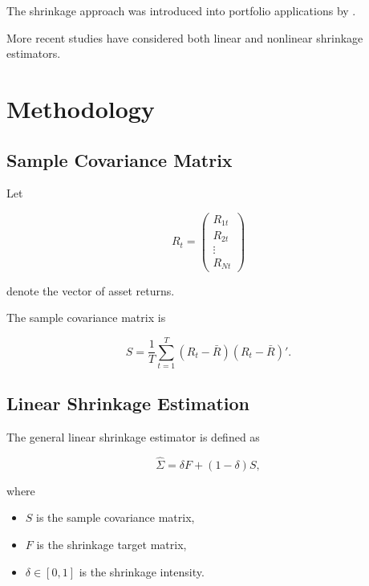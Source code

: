 \documentclass[12pt,a4paper]{article}
\begin{document}
	The shrinkage approach was introduced into portfolio
	applications by \citet{ledoit2004}.
	
	More recent studies have considered both linear and
	nonlinear shrinkage estimators.
	
	
	
	\section{Methodology}
	
	
	\subsection{Sample Covariance Matrix}
	
	Let
	
	\[
	R_t =
	\begin{pmatrix}
		R_{1t}\\
		R_{2t}\\
		\vdots\\
		R_{Nt}
	\end{pmatrix}
	\]
	
	denote the vector of asset returns.
	
	The sample covariance matrix is
	
	\begin{equation}
		S
		=
		\frac{1}{T}
		\sum_{t=1}^{T}
		(R_t-\bar R)(R_t-\bar R)'.
	\end{equation}
	
	
	\subsection{Linear Shrinkage Estimation}
	
	The general linear shrinkage estimator is defined as
	
	\begin{equation}
		\widehat{\Sigma}
		=
		\delta F
		+
		(1-\delta)S,
	\end{equation}
	
	where
	
	\begin{itemize}
		
		\item $S$ is the sample covariance matrix,
		
		\item $F$ is the shrinkage target matrix,
		
		\item $\delta \in [0,1]$ is the shrinkage intensity.
		
	\end{itemize}
	
\end{document}
